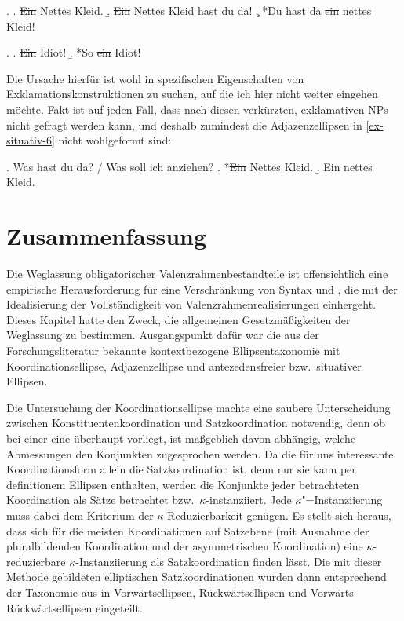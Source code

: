 \ex. \label{ex-situativ-4}
\a. \sout{Ein} Nettes Kleid.
\b. \sout{Ein} Nettes Kleid hast du da!
\c. *Du hast da \sout{ein} nettes Kleid!

\ex. \label{ex-situativ-5}
\a. \sout{Ein} Idiot!
\b. *So \sout{ein} Idiot!

Die Ursache hierfür ist wohl in spezifischen Eigenschaften von Exklamationskonstruktionen zu suchen, auf die ich hier nicht weiter eingehen möchte. Fakt ist auf jeden Fall, dass nach diesen verkürzten, exklamativen NPs nicht gefragt werden kann, und deshalb zumindest die Adjazenzellipsen in \ref{ex-situativ-6} nicht wohlgeformt sind:    

\ex. \label{ex-situativ-6}Was hast du da? / Was soll ich anziehen?
\a. *\sout{Ein} Nettes Kleid.
\b. Ein nettes Kleid.



\section{Zusammenfassung}

Die Weglassung obligatorischer Valenzrahmenbestandteile ist offensichtlich eine empirische Herausforderung für eine Verschränkung von Syntax und , die mit der Idealisierung der  Vollständigkeit von Valenzrahmenrealisierungen einhergeht. Dieses Kapitel hatte den Zweck, die allgemeinen Gesetzmäßigkeiten der Weglassung zu bestimmen. Ausgangspunkt dafür war die aus der Forschungsliteratur bekannte kontextbezogene Ellipsentaxonomie mit Koordinationsellipse, Adjazenzellipse und antezedensfreier bzw.\ situativer Ellipsen. 

Die Untersuchung der Koordinationsellipse machte eine saubere Unterscheidung zwischen Konstituentenkoordination und Satzkoordination notwendig, denn ob bei einer  eine  überhaupt vorliegt, ist ma\ss geblich davon abhängig, welche Abmessungen den Konjunkten zugesprochen werden. Da die für uns interessante Koordinationsform allein die Satzkoordination ist, denn nur sie kann per definitionem Ellipsen enthalten, werden die Konjunkte jeder betrachteten Koordination als Sätze betrachtet bzw.\ $\kappa$-instanziiert. Jede $\kappa$"=Instanziierung muss dabei dem Kriterium der $\kappa$-Reduzierbarkeit genügen. Es stellt sich heraus, dass sich für die meisten Koordinationen auf Satzebene (mit Ausnahme der pluralbildenden Koordination und der asymmetrischen Koordination) eine $\kappa$-reduzierbare $\kappa$-Instanziierung als Satzkoordination finden lässt. Die mit dieser Methode gebildeten elliptischen Satzkoordinationen wurden dann entsprechend der Taxonomie aus \cite{Klein:93} in Vorwärtsellipsen, Rückwärtsellipsen und Vorwärts-Rückwärtsellipsen eingeteilt.  

